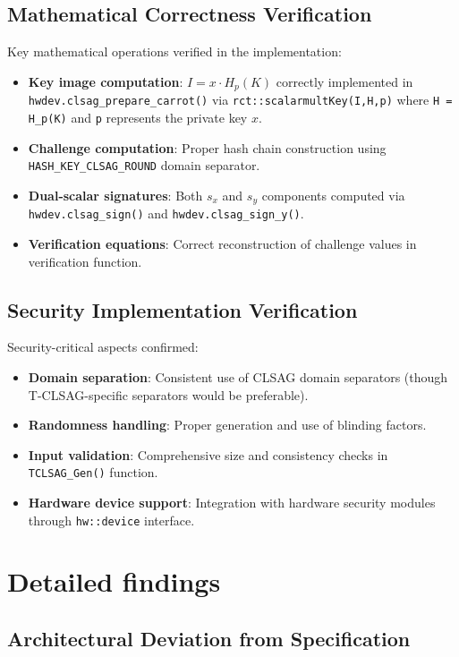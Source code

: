 \documentclass{article}
\begin{document}
\subsection{Mathematical Correctness Verification}
Key mathematical operations verified in the implementation:
\begin{itemize}
  \item \textbf{Key image computation}: $I = x \cdot H_p(K)$ correctly implemented 
        in \texttt{hwdev.clsag\_prepare\_carrot()} via \texttt{rct::scalarmultKey(I,H,p)} 
        where \texttt{H = H\_p(K)} and \texttt{p} represents the private key $x$.
  \item \textbf{Challenge computation}: Proper hash chain construction using 
        \texttt{HASH\_KEY\_CLSAG\_ROUND} domain separator.
  \item \textbf{Dual-scalar signatures}: Both $s_x$ and $s_y$ components computed 
        via \texttt{hwdev.clsag\_sign()} and \texttt{hwdev.clsag\_sign\_y()}.
  \item \textbf{Verification equations}: Correct reconstruction of challenge values 
        in verification function.
\end{itemize}

\subsection{Security Implementation Verification}
Security-critical aspects confirmed:
\begin{itemize}
  \item \textbf{Domain separation}: Consistent use of CLSAG domain separators 
        (though T-CLSAG-specific separators would be preferable).
  \item \textbf{Randomness handling}: Proper generation and use of blinding factors.
  \item \textbf{Input validation}: Comprehensive size and consistency checks in 
        \texttt{TCLSAG\_Gen()} function.
  \item \textbf{Hardware device support}: Integration with hardware security modules 
        through \texttt{hw::device} interface.
\end{itemize}

\section{Detailed findings}

\subsection{Architectural Deviation from Specification}
\end{document}
